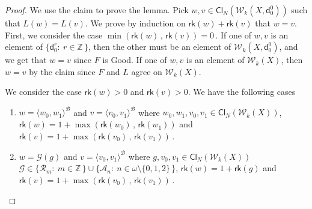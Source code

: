 \documentclass[10pt,a4paper, openany,  oldfontcommands]{memoir}
\newtheorem{open problem} [theorem] {Open Problem}
\newtheorem{open question} [theorem] {Open Question}
\begin{document}
\begin{proof}
 
 
 
 We use the claim to prove the lemma. 
Pick    $  w,  v    \in   \mathsf{Cl}_{N}  \left(  \mathcal{W}_{k}  \left( X ,  \mathsf{d}^0_0  \right)   \right) $  such that  $  L(w)  =  L(v )  $. 
We prove by induction on  $  \mathsf{rk}  \left( w  \right)  +   \mathsf{rk}  \left( v  \right)   $  that  $  w  = v $. 
First,  we  consider the case  $  \min  \left(   \mathsf{rk}  \left( w  \right)     \,  ,  \,    \mathsf{rk}  \left( v  \right)     \right)  =  0   \,    $.
If    one of  $  w,  v  $  is an element of  $  \big\{  \mathsf{d}^r_0  :   \  r  \in  \mathbb{Z}  \,  \big\}  $, 
then the other must be an element of  $  \mathcal{W}_{k}  \left( X ,  \mathsf{d}^0_0  \right)   $,   
and we get  that     $  w  = v  $   since   $F$ is   \textsf{Good}. 
If  one of     $  w,  v  $   is   an element  of    $  \mathcal{W}_{k}  \left( X  \right)   $,  
then  $   w   =   v  $  by the claim  since  $F$ and $L$ agree on   $  \mathcal{W}_{k}  \left( X  \right)   $. 





We consider the case    $   \mathsf{rk}  \left( w  \right)    > 0  $  and     $    \mathsf{rk}  \left( v  \right)    >  0  $. 
We    have the following cases
\begin{enumerate}
\item    $  w  =  \langle  w_0 ,  w_1  \rangle^{  \mathcal{B}  }  $  and  $  v =  \langle  v_0, v_1  \rangle^{  \mathcal{B}  }  $
where  $ w_0, w_1,  v_0, v_1  \in     \mathsf{Cl}_{N}  \left(  \mathcal{W}_{k}  \left( X  \right)   \right)     $, 
 $  \mathsf{rk} \left(  w  \right)  =  1  +  \max\left(   \mathsf{rk} \left(  w_0 \right)  \,  ,  \,    \mathsf{rk} \left(  w_1  \right)   \right)     $ 
and  $  \mathsf{rk} \left(  v  \right)  =  1  +  \max\left(   \mathsf{rk} \left(  v_0 \right)  \,  ,  \,    \mathsf{rk} \left(  v_1  \right)   \right)    \,   $. 
  



\item     $  w  =    \mathcal{G}  \left(  g  \right)  $  and  $  v =  \langle v_0, v_1  \rangle^{  \mathcal{B}  }  $
where  $ g,  v_0, v_1  \in     \mathsf{Cl}_{N}  \left(  \mathcal{W}_{k}  \left( X  \right)   \right)     $
  $  \mathcal{G}     \in  \lbrace  \mathcal{R}_m   :  \   m  \in  \mathbb{Z} \,   \rbrace   \cup 
 \lbrace  \mathcal{A}_n :  \   n  \in    \omega  \setminus \lbrace 0, 1 ,  2   \rbrace  \,   \rbrace      $, 
  $  \mathsf{rk} \left(  w  \right)  =  1  +  \mathsf{rk} \left(  g \right)    $
and  $  \mathsf{rk} \left(  v  \right)  =  1  +  \max\left(   \mathsf{rk} \left(  v_0 \right)  \,  ,  \,    \mathsf{rk} \left(  v_1  \right)   \right)    \,   $. 




\end{enumerate}
\end{proof}
\end{document}
